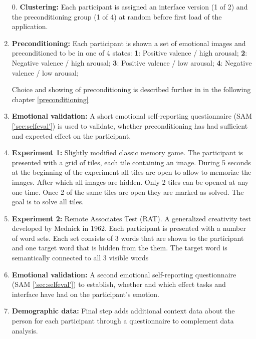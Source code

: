 	\begin{enumerate}
		
		\item[0.] \textbf{Clustering:} Each participant is assigned an interface version (1 of 2) and the preconditioning group (1 of 4) at random before first load of the application.
		
		\item \textbf{Preconditioning:} Each participant is shown a set of emotional images and preconditioned to be in one of 4 states:
			\textbf{1}: Positive valence / high arousal;
			\textbf{2}: Negative valence / high arousal;
			\textbf{3}: Positive valence / low arousal;
			\textbf{4}: Negative valence / low arousal;
			
		Choice and showing of preconditioning is described further in in the following chapter \ref{preconditioning}
			
		\item \textbf{Emotional validation:} A short emotional self-reporting questionnaire (SAM \ref{'sec:selfeval'}) is used to validate, whether preconditioning has had sufficient and expected effect on the participant.
		
		\item \textbf{Experiment 1:} Slightly modified classic memory game. The participant is presented with a grid of tiles, each tile containing an image. During 5 seconds at the beginning of the experiment all tiles are open to allow to memorize the images. After which all images are hidden. Only 2 tiles can be opened at any one time. Once 2 of the same tiles are open they are marked as solved. The goal is to solve all tiles.
		
		\item \textbf{Experiment 2:} Remote Associates Test (RAT). A generalized creativity test developed by Mednick \cite{Mednick1962} in 1962. Each participant is presented with a number of word sets. Each set consists of 3 words that are shown to the participant and one target word that is hidden from the them. The target word is semantically connected to all 3 visible words
		
		\item \textbf{Emotional validation:} A second emotional self-reporting questionnaire (SAM \ref{'sec:selfeval'}) to establish, whether and which effect tasks and interface have had on the participant's emotion.
		
		\item \textbf{Demographic data:} Final step adds additional context data about the person for each participant through a questionnaire to complement data analysis.
		
		
	\end{enumerate}
	
